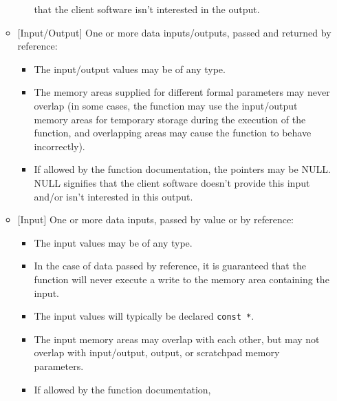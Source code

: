 \begin{itemize}
\begin{itemize}
\begin{itemize}
                  that the client
                  software isn't interested in the output.
            \end{itemize}
      \item $[$Input/Output$]$ One or more data
            inputs/outputs, passed and
            returned by reference:
            \begin{itemize}
            \item The input/output values may be of any
                  type.
            \item The memory areas supplied for different
                  formal parameters
                  may never overlap (in some cases, the
                  \emph{\productbasenameshort{}} function
                  may use the
                  input/output memory areas for temporary
                  storage during the
                  execution of the function, and overlapping
                  areas may
                  cause the \emph{\productbasenameshort{}}
                  function to behave
                  incorrectly).
            \item If allowed by the function documentation,
                  the
                  pointers may be NULL\@.  NULL signifies
                  that the client
                  software doesn't provide this input and/or
                  isn't interested in this
                  output.
            \end{itemize}
      \item $[$Input$]$ One or more data inputs, passed by
            value or by reference:
            \begin{itemize}
            \item The input values may be of any type.
            \item In the case of data passed by reference,
                  it is guaranteed
                  that the \emph{\productbasenameshort{}}
                  function
                  will never execute a write to the memory
                  area containing
                  the input.
            \item The input values will typically be
                  declared \texttt{const *}.
            \item The input memory areas may overlap with
                  each other, but may not overlap
                  with input/output, output, or scratchpad
                  memory parameters.
            \item If allowed by the function documentation,

\end{itemize}
\end{itemize}
\end{itemize}
